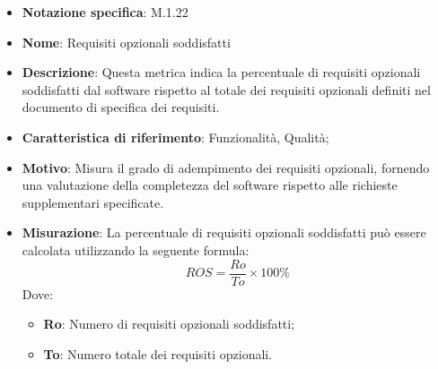 \begin{itemize}
    \item \textbf{Notazione specifica}: M.1.22
    \item \textbf{Nome}: Requisiti opzionali soddisfatti
    \item \textbf{Descrizione}: Questa metrica indica la percentuale di requisiti opzionali soddisfatti dal software rispetto al totale dei requisiti opzionali definiti nel documento di specifica dei requisiti.
    \item \textbf{Caratteristica di riferimento}: Funzionalità, Qualità;
    \item \textbf{Motivo}: Misura il grado di adempimento dei requisiti opzionali, fornendo una valutazione della completezza del software rispetto alle richieste supplementari specificate.
    \item \textbf{Misurazione}: La percentuale di requisiti opzionali soddisfatti può essere calcolata utilizzando la seguente formula:
    \[ ROS = \frac{Ro}{To} \times 100\% \]
    Dove:
    \begin{itemize}
        \item \textbf{Ro}: Numero di requisiti opzionali soddisfatti;
        \item \textbf{To}: Numero totale dei requisiti opzionali.
    \end{itemize}
\end{itemize}
